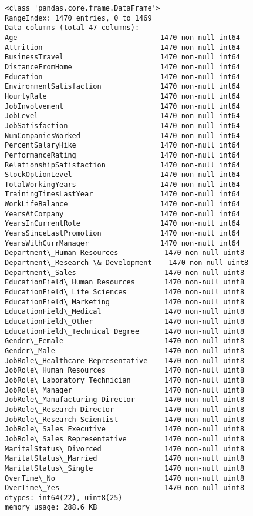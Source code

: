 \documentclass[11pt]{article}
\begin{document}
    \begin{Verbatim}[commandchars=\\\{\}]
<class 'pandas.core.frame.DataFrame'>
RangeIndex: 1470 entries, 0 to 1469
Data columns (total 47 columns):
Age                                  1470 non-null int64
Attrition                            1470 non-null int64
BusinessTravel                       1470 non-null int64
DistanceFromHome                     1470 non-null int64
Education                            1470 non-null int64
EnvironmentSatisfaction              1470 non-null int64
HourlyRate                           1470 non-null int64
JobInvolvement                       1470 non-null int64
JobLevel                             1470 non-null int64
JobSatisfaction                      1470 non-null int64
NumCompaniesWorked                   1470 non-null int64
PercentSalaryHike                    1470 non-null int64
PerformanceRating                    1470 non-null int64
RelationshipSatisfaction             1470 non-null int64
StockOptionLevel                     1470 non-null int64
TotalWorkingYears                    1470 non-null int64
TrainingTimesLastYear                1470 non-null int64
WorkLifeBalance                      1470 non-null int64
YearsAtCompany                       1470 non-null int64
YearsInCurrentRole                   1470 non-null int64
YearsSinceLastPromotion              1470 non-null int64
YearsWithCurrManager                 1470 non-null int64
Department\_Human Resources           1470 non-null uint8
Department\_Research \& Development    1470 non-null uint8
Department\_Sales                     1470 non-null uint8
EducationField\_Human Resources       1470 non-null uint8
EducationField\_Life Sciences         1470 non-null uint8
EducationField\_Marketing             1470 non-null uint8
EducationField\_Medical               1470 non-null uint8
EducationField\_Other                 1470 non-null uint8
EducationField\_Technical Degree      1470 non-null uint8
Gender\_Female                        1470 non-null uint8
Gender\_Male                          1470 non-null uint8
JobRole\_Healthcare Representative    1470 non-null uint8
JobRole\_Human Resources              1470 non-null uint8
JobRole\_Laboratory Technician        1470 non-null uint8
JobRole\_Manager                      1470 non-null uint8
JobRole\_Manufacturing Director       1470 non-null uint8
JobRole\_Research Director            1470 non-null uint8
JobRole\_Research Scientist           1470 non-null uint8
JobRole\_Sales Executive              1470 non-null uint8
JobRole\_Sales Representative         1470 non-null uint8
MaritalStatus\_Divorced               1470 non-null uint8
MaritalStatus\_Married                1470 non-null uint8
MaritalStatus\_Single                 1470 non-null uint8
OverTime\_No                          1470 non-null uint8
OverTime\_Yes                         1470 non-null uint8
dtypes: int64(22), uint8(25)
memory usage: 288.6 KB

    \end{Verbatim}
\end{document}
